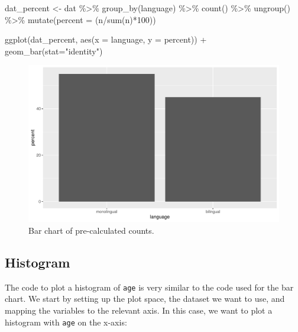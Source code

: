 \documentclass[
  english,
  doc,floatsintext]{apa6}
\newenvironment{Shaded}{\begin{snugshade}}{\end{snugshade}}
\newcommand{\AttributeTok}[1]{\textcolor[rgb]{0.77,0.63,0.00}{#1}}
\newcommand{\DecValTok}[1]{\textcolor[rgb]{0.00,0.00,0.81}{#1}}
\newcommand{\FunctionTok}[1]{\textcolor[rgb]{0.00,0.00,0.00}{#1}}
\newcommand{\NormalTok}[1]{#1}
\newcommand{\OtherTok}[1]{\textcolor[rgb]{0.56,0.35,0.01}{#1}}
\newcommand{\SpecialCharTok}[1]{\textcolor[rgb]{0.00,0.00,0.00}{#1}}
\newcommand{\StringTok}[1]{\textcolor[rgb]{0.31,0.60,0.02}{#1}}
\begin{document}
\begin{Shaded}
\begin{Highlighting}[]
\NormalTok{dat\_percent }\OtherTok{\textless{}{-}}\NormalTok{ dat }\SpecialCharTok{\%\textgreater{}\%}
  \FunctionTok{group\_by}\NormalTok{(language) }\SpecialCharTok{\%\textgreater{}\%}
  \FunctionTok{count}\NormalTok{() }\SpecialCharTok{\%\textgreater{}\%}
  \FunctionTok{ungroup}\NormalTok{() }\SpecialCharTok{\%\textgreater{}\%}
  \FunctionTok{mutate}\NormalTok{(}\AttributeTok{percent =}\NormalTok{ (n}\SpecialCharTok{/}\FunctionTok{sum}\NormalTok{(n)}\SpecialCharTok{*}\DecValTok{100}\NormalTok{))}

\FunctionTok{ggplot}\NormalTok{(dat\_percent, }\FunctionTok{aes}\NormalTok{(}\AttributeTok{x =}\NormalTok{ language, }\AttributeTok{y =}\NormalTok{ percent)) }\SpecialCharTok{+}
  \FunctionTok{geom\_bar}\NormalTok{(}\AttributeTok{stat=}\StringTok{"identity"}\NormalTok{) }
\end{Highlighting}
\end{Shaded}

\begin{figure}

{\centering \includegraphics[width=1\linewidth]{images/bar-precalc-1} 

}

\caption{Bar chart of pre-calculated counts.}\label{fig:bar-precalc}
\end{figure}

\hypertarget{histogram}{%
\subsection{Histogram}\label{histogram}}

The code to plot a histogram of \texttt{age} is very similar to the code used for the bar chart. We start by setting up the plot space, the dataset we want to use, and mapping the variables to the relevant axis. In this case, we want to plot a histogram with \texttt{age} on the x-axis:
\end{document}
